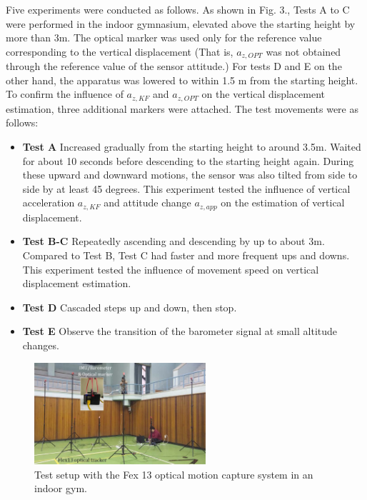 \documentclass[10pt,journal,compsoc]{IEEEtran}
\begin{document}
Five experiments were conducted as follows. As shown in Fig. 3., Tests A to C 
were performed in the indoor gymnasium, elevated above the
starting height by more than 3m. The optical marker was used only for the
reference value corresponding to the vertical displacement (That is, $a_{z,OPT}$
was not obtained through the reference value of the sensor attitude.) 
For tests D and E on the other hand, the apparatus was lowered to within 1.5 m from the starting height.
To confirm the influence of $a_{z,KF}$ and $a_{z,OPT}$ on the vertical displacement
estimation, three additional markers were attached.  The test movements were as follows:
\begin{itemize}
    \item \textbf{Test A} Increased gradually from the starting height to around 3.5m.
         Waited for about 10 seconds before descending to the starting height again.
         During these upward and downward motions, the sensor was also tilted from side to side
         by at least 45 degrees.  This experiment tested the influence of vertical
         acceleration $a_{z,KF}$ and attitude change $a_{z,app}$ on the estimation of
         vertical displacement.
    \item \textbf{Test B-C} Repeatedly ascending and descending by up to about 3m. Compared to Test B, 
        Test C had faster and more frequent ups and downs. This experiment
        tested the influence of movement speed on vertical displacement estimation.
    \item \textbf{Test D} Cascaded steps up and down, then stop.
    \item \textbf{Test E} Observe the transition of the barometer signal at small altitude changes.
\end{itemize}

\begin{figure}[!t]
\centering
\includegraphics[width=2.5in]{fig3}
\caption{Test setup with the Fex 13 optical motion capture system in an indoor gym.}
\label{fig3}
\end{figure}
\end{document}
